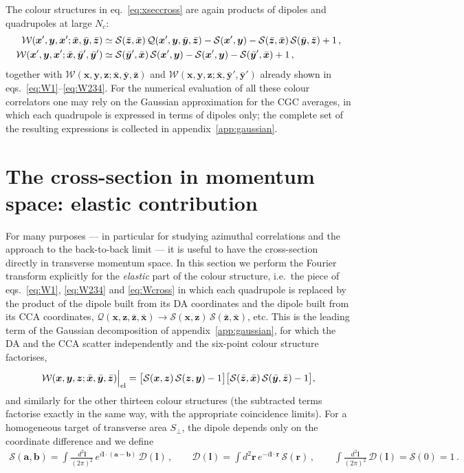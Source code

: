 \documentclass[11pt,a4paper]{article}
\newcommand{\calW}{\mathcal{W}}
\newcommand{\calD}{\mathcal{D}}
\newcommand{\calQ}{\mathcal{Q}}
\newcommand{\calS}{\mathcal{S}}
\newcommand{\Spe}{S_{\perp}}
\newcommand{\vx}{\bm{x}}
\newcommand{\vy}{\bm{y}}
\newcommand{\vz}{\bm{z}}
\newcommand{\vxb}{\bar{\bm{x}}}
\newcommand{\vyb}{\bar{\bm{y}}}
\newcommand{\vzb}{\bar{\bm{z}}}
\newcommand{\vl}{\bm{l}}
\numberwithin{equation}{section}
\begin{document}
The colour structures in eq.~\eqref{eq:xseccross} are again products of dipoles and
quadrupoles at large $N_c$:
\begin{align}
\label{eq:Wcross}
\calW(\vx',\vy,\vx';\vxb,\vyb,\vzb) &\simeq \calS(\vzb,\vxb)\,\calQ(\vx',\vy,\vyb,\vzb)
- \calS(\vx',\vy) - \calS(\vzb,\vxb)\,\calS(\vyb,\vzb) + 1\,,\notag\\
\calW(\vx',\vy,\vx';\vxb,\vyb',\vyb') &\simeq \calS(\vyb',\vxb)\, \calS(\vx',\vy)
- \calS(\vx',\vy) - \calS(\vyb',\vxb) +1\,,
\end{align}
together with $\calW(\vx,\vy,\vz;\vxb,\vyb,\vzb)$ and $\calW(\vx,\vy,\vz;\vxb,\vyb',\vyb')$
already shown in eqs.~\eqref{eq:W1}--\eqref{eq:W234}. For the numerical evaluation of all
these colour correlators one may rely on the Gaussian approximation for the CGC averages, in
which each quadrupole is expressed in terms of dipoles only; the complete set of the resulting
expressions is collected in appendix~\ref{app:gaussian}.

\section{The cross-section in momentum space: elastic contribution}
\label{sec:momspace}

For many purposes --- in particular for studying azimuthal correlations and the approach to
the back-to-back limit --- it is useful to have the cross-section directly in transverse
momentum space. In this section we perform the Fourier transform explicitly for the
\emph{elastic} part of the colour structure, i.e.\ the piece of eqs.~\eqref{eq:W1},
\eqref{eq:W234} and \eqref{eq:Wcross} in which each quadrupole is replaced by the product of
the dipole built from its DA coordinates and the dipole built from its CCA coordinates,
$\calQ(\vx,\vz,\vzb,\vxb)\to \calS(\vx,\vz)\,\calS(\vzb,\vxb)$, etc. This is the leading term
of the Gaussian decomposition of appendix~\ref{app:gaussian}, for which the DA and the CCA
scatter independently and the six-point colour structure factorises,
\begin{align}
\label{eq:Welastic}
\calW(\vx,\vy,\vz;\vxb,\vyb,\vzb)\Big|_{\rm el} =
\big[\calS(\vx,\vz)\,\calS(\vz,\vy)-1\big]\big[\calS(\vzb,\vxb)\,\calS(\vyb,\vzb)-1\big],
\end{align}
and similarly for the other thirteen colour structures (the subtracted terms factorise
exactly in the same way, with the appropriate coincidence limits). For a homogeneous target
of transverse area $\Spe$, the dipole depends only on the coordinate difference and we define
\begin{align}
\label{eq:Dldef}
\calS(\bm a,\bm b) = \int\frac{d^{2}\vl}{(2\pi)^{2}}\,e^{i\vl\cdot(\bm a-\bm b)}\,
\calD(\vl)\,,\qquad
\calD(\vl) = \int d^{2}\bm r\,e^{-i\vl\cdot \bm r}\,\calS(\bm r)\,,\qquad
\int\frac{d^{2}\vl}{(2\pi)^{2}}\,\calD(\vl)=\calS(0)=1\,.
\end{align}
\end{document}
